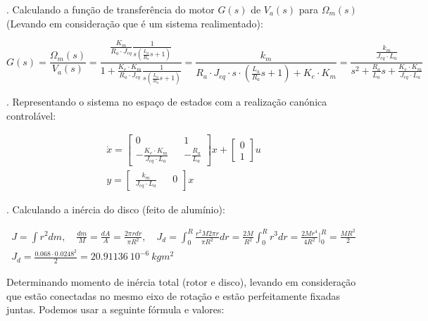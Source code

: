 \documentclass[10pt]{article}
\begin{document}
. Calculando a função de transferência do motor $G(s)$ de $V_a(s)$ para $\Omega_m(s)$
(Levando em consideração que é um sistema realimentado):

\begin{equation}
    G(s) = \frac{\Omega_m(s)}{V_a(s)}
    = \frac{\frac{K_m}{R_a \cdot J_{eq}}\frac{1}{s (\frac{L_a}{R_a}s + 1)}}{1 + \frac{K_e \cdot K_m}{R_a \cdot J_{eq}}\frac{1}{s (\frac{L_a}{R_a}s + 1)}}
    = \frac{k_m}{R_a \cdot J_{eq} \cdot s \cdot (\frac{L_a}{R_a}s + 1) + K_e \cdot K_m}
    = \frac{\frac{k_m}{J_{eq} \cdot L_a}}{s^2 + \frac{R_a}{L_a}s + \frac{K_e \cdot K_m}{J_{eq} \cdot L_a}}
\end{equation}

. Representando o sistema no espaço de estados com a realização canónica controlável:

\begin{equation}
\begin{aligned}
    \dot{x} =
    \begin{bmatrix}
        0 && 1 \\
        -\frac{K_e \cdot K_m}{J_{eq} \cdot L_a} && -\frac{R_a}{L_a}
    \end{bmatrix} x
    +
    \begin{bmatrix}
        0 \\
        1
    \end{bmatrix}
    u \\
    y =
    \begin{bmatrix}
        \frac{k_m}{J_{eq} \cdot L_a} && 0
    \end{bmatrix} x
\end{aligned}
\end{equation}

. Calculando a inércia do disco (feito de alumínio):

\begin{equation}
\begin{aligned}
    J = \int r^2 dm
    ,\quad \frac{dm}{M} = \frac{dA}{A} = \frac{2 \pi r dr}{\pi R^2}
    ,\quad J_d = \int_{0}^{R} \frac{r^2 M 2 \pi r}{\pi R^2} dr
    = \frac{2M}{R^2} \int_{0}^{R} r^3 dr
    = \frac{2Mr^4}{4R^2} \Bigg|_{0}^{R}
    = \frac{MR^2}{2} \\
    J_d = \frac{0.068 \cdot 0.0248^2}{2} = 20.91136 \ 10^{-6} \ kgm^2
\end{aligned}
\end{equation}

\quad Determinando momento de inércia total (rotor e disco),
levando em consideração que estão conectadas no mesmo eixo de rotação e
estão perfeitamente fixadas juntas. Podemos usar a seguinte fórmula e valores:
\end{document}
